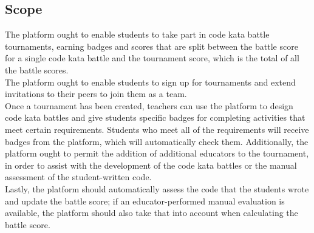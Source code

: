 \subsection{Scope}
%
The platform ought to enable students to take part in code kata battle tournaments, earning badges and scores that are split between the battle score for a single code kata battle and the tournament score, which is the total of all the 
battle scores.\\
The platform ought to enable students to sign up for tournaments and extend invitations to their peers to join them as a team.\\ 
Once a tournament has been created, teachers can use the platform to design code kata battles and give students specific badges for completing activities that meet certain requirements. Students who meet all of the requirements will 
receive badges from the platform, which will automatically check them. Additionally, the platform ought to permit the addition of additional educators to the tournament, in order to assist with the development of the code kata battles 
or the manual assessment of the student-written code.\\
Lastly, the platform should automatically assess the code that the students wrote and update the battle score; if an educator-performed manual evaluation is available, the platform should also take that into account when calculating the 
battle score.

